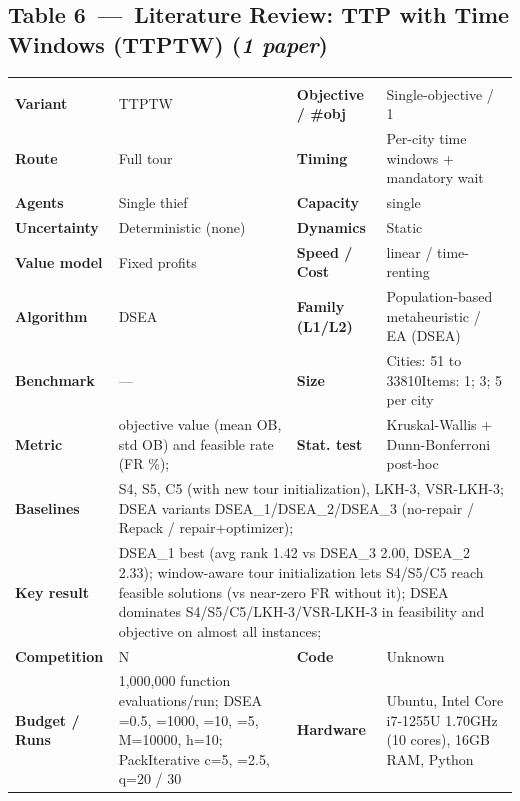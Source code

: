 \documentclass[
  a4paper,
  11pt,
  headings=small,
  numbers=noenddot,
  abstract=on,
  parskip=half,
]{scrartcl}
\begin{document}
\begin{landscape}
\section*{Table 6~---~Literature Review: TTP with Time Windows (TTPTW) \quad\normalfont(\textit{1 paper})}
\renewcommand{\arraystretch}{1.15}\footnotesize
\begin{longtable}{@{}p{2.6cm}p{8.7cm}p{2.6cm}p{8.7cm}@{}}
\endfirsthead\endhead
\rowcolor{NavyLight}\multicolumn{4}{@{}p{22.7cm}@{}}{\textbf{[1]~\cite{angmalisang2026traveling}} --- \textit{The Traveling Thief Problem with Time Windows: Benchmarks and Heuristics}}\\
\textbf{Variant} & TTPTW & \textbf{Objective / \#obj} & Single-objective / 1 \\
\textbf{Route} & Full tour & \textbf{Timing} & Per-city time windows + mandatory wait \\
\textbf{Agents} & Single thief & \textbf{Capacity} & single \\
\textbf{Uncertainty} & Deterministic (none) & \textbf{Dynamics} & Static \\
\textbf{Value model} & Fixed profits & \textbf{Speed / Cost} & linear / time-renting \\
\textbf{Algorithm} & DSEA & \textbf{Family (L1/L2)} & Population-based metaheuristic / EA (DSEA) \\
\textbf{Benchmark} & --- & \textbf{Size} & Cities: 51 to 33810\newline Items: 1; 3; 5 per city \\
\textbf{Metric} & objective value (mean OB, std OB) and feasible rate (FR \%); & \textbf{Stat. test} & Kruskal-Wallis + Dunn-Bonferroni post-hoc \\
\textbf{Baselines} & \multicolumn{3}{p{20.0cm}}{S4, S5, C5 (with new tour initialization), LKH-3, VSR-LKH-3; DSEA variants DSEA\_1/DSEA\_2/DSEA\_3 (no-repair / Repack / repair+optimizer);} \\
\textbf{Key result} & \multicolumn{3}{p{20.0cm}}{DSEA\_1 best (avg rank 1.42 vs DSEA\_3 2.00, DSEA\_2 2.33); window-aware tour initialization lets S4/S5/C5 reach feasible solutions (vs near-zero FR without it); DSEA dominates S4/S5/C5/LKH-3/VSR-LKH-3 in feasibility and objective on almost all instances;} \\
\textbf{Competition} & N & \textbf{Code} & Unknown \\
\textbf{Budget / Runs} & 1,000,000 function evaluations/run; DSEA =0.5, =1000, =10, =5, M=10000, h=10; PackIterative c=5, =2.5, q=20 / 30 & \textbf{Hardware} & Ubuntu, Intel Core i7-1255U 1.70GHz (10 cores), 16GB RAM, Python \\

\end{longtable}
\end{landscape}
\end{document}

